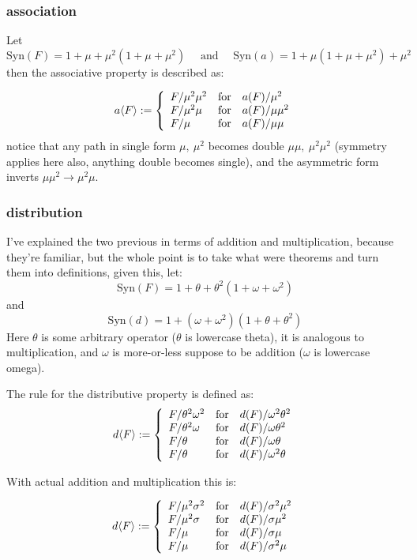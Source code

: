 \documentclass[twoside]{article}
\begin{document}
\subsubsection{association}

Let
$$ \mbox{Syn}(F)=1+\mu+\mu^2(1+\mu+\mu^2)\quad\mbox{ and }\quad \mbox{Syn}(a)=1+\mu(1+\mu+\mu^2)+\mu^2 $$
then the associative property is described as:

$$ a\langle F\rangle :=\left\{
\begin{array}{l@{\quad\mbox{for}\quad}l}
 F/\mu^2\mu^2 & a(F)/\mu^2 \\
 F/\mu^2\mu & a(F)/\mu\mu^2 \\
 F/\mu & a(F)/\mu\mu
\end{array}\right. $$
notice that any path in single form $ \mu,\ \mu^2 $ becomes double $ \mu\mu,\ \mu^2\mu^2 $ (symmetry
applies here also, anything double becomes single), and the asymmetric form inverts
$ \mu\mu^2\rightarrow\mu^2\mu $.

\subsubsection{distribution}

I've explained the two previous in terms of addition and multiplication, because they're familiar, but the whole point
is to take what were theorems and turn them into definitions, given this, let:
$$ \mbox{Syn}(F)=1+\theta+\theta^2(1+\omega+\omega^2) $$
and
$$ \mbox{Syn}(d)=1+(\omega+\omega^2)(1+\theta+\theta^2) $$
Here $ \theta $ is some arbitrary operator ($ \theta $ is lowercase theta), it is analogous to multiplication, and
$ \omega $ is more-or-less suppose to be addition ($ \omega $ is lowercase omega).  

The rule for the distributive property is defined as:
$$ d\langle F\rangle :=\left\{
\begin{array}{l@{\quad\mbox{for}\quad}l}
 F/\theta^2\omega^2 & d(F)/\omega^2\theta^2 \\
 F/\theta^2\omega & d(F)/\omega\theta^2 \\
 F/\theta & d(F)/\omega\theta \\
 F/\theta & d(F)/\omega^2\theta
\end{array}\right. $$

With actual addition and multiplication this is:

$$ d\langle F\rangle :=\left\{
\begin{array}{l@{\quad\mbox{for}\quad}l}
 F/\mu^2\sigma^2 & d(F)/\sigma^2\mu^2 \\
 F/\mu^2\sigma & d(F)/\sigma\mu^2 \\
 F/\mu & d(F)/\sigma\mu \\
 F/\mu & d(F)/\sigma^2\mu
\end{array}\right. $$
\end{document}
